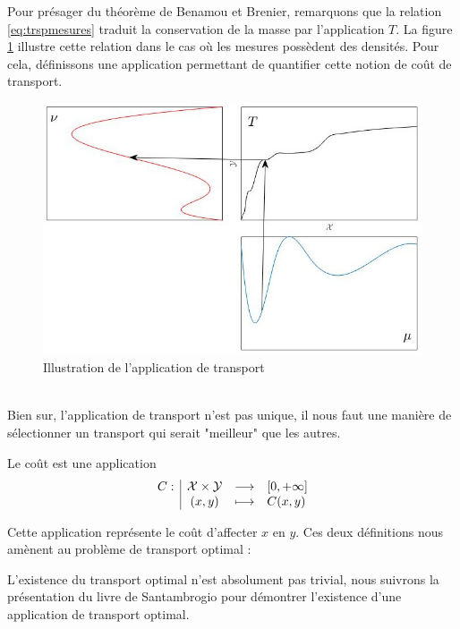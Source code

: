 \documentclass[a4paper,12pt]{article}
\begin{document}
Pour présager du théorème de Benamou et Brenier, remarquons que la relation \eqref{eq:trspmesures} traduit la conservation de la masse par l'application $T$. La figure \ref{fig:illustrans} illustre cette relation dans le cas où les mesures possèdent des densités. Pour cela, définissons une application permettant de quantifier cette notion de coût de transport. 
\begin{figure}[!h]
\centering
\includegraphics[width=0.7\linewidth]{img/transport.jpg}
\caption{\label{fig:illustrans}Illustration de l'application de transport}
\end{figure}\\
Bien sur, l'application de transport n'est pas unique, il nous faut une manière de sélectionner un transport qui serait "meilleur" que les autres. 
\newpage
\begin{definition}{}
Le coût est une application 
$$
\begin{array}[t]{l|ccl} C: & \mathcal{X}\times\mathcal{Y} & \longrightarrow & [0,+\infty] \\ & (x,y) & \longmapsto & C(x,y) \end{array}
$$
\end{definition}
Cette application représente le coût d'affecter $x$ en $y$. Ces deux définitions nous amènent au problème de transport optimal : \\

\vspace{0.3cm}

L'existence du transport optimal n'est absolument pas trivial, nous suivrons la présentation du livre de Santambrogio  \cite{santambrogio2015optimal} pour démontrer l'existence d'une application de transport optimal.
\end{document}
